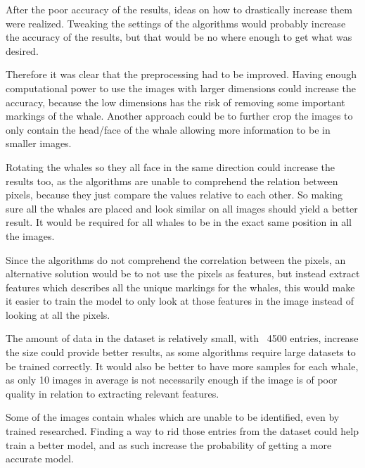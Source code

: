 After the poor accuracy of the results, ideas on how to drastically increase them were realized. Tweaking the settings of the algorithms would probably increase the accuracy of the results, but that would be no where enough to get what was desired. 

Therefore it was clear that the preprocessing had to be improved. Having enough computational power to use the images with larger dimensions could increase the accuracy, because the low dimensions has the risk of removing some important markings of the whale. Another approach could be to further crop the images to only contain the head/face of the whale allowing more information to be in smaller images.

Rotating the whales so they all face in the same direction could increase the results too, as the algorithms are unable to comprehend the relation between pixels, because they just compare the values relative to each other. So making sure all the whales are placed and look similar on all images should yield a better result. It would be required for all whales to be in the exact same position in all the images.

Since the algorithms do not comprehend the correlation between the pixels, an alternative solution would be to not use the pixels as features, but instead extract features which describes all the unique markings for the whales, this would make it easier to train the model to only look at those features in the image instead of looking at all the pixels.

The amount of data in the dataset is relatively small, with ~4500 entries, increase the size could provide better results, as some algorithms require large datasets to be trained correctly. It would also be better to have more samples for each whale, as only 10 images in average is not necessarily enough if the image is of poor quality in relation to extracting relevant features.

Some of the images contain whales which are unable to be identified, even by trained researched. Finding a way to rid those entries from the dataset could help train a better model, and as such increase the probability of getting a more accurate model.